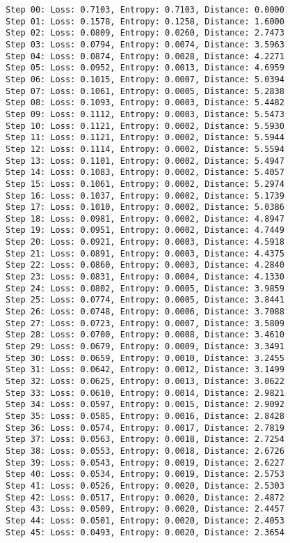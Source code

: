 \documentclass[11pt]{article}
\begin{document}
\begin{Verbatim}[commandchars=\\\{\}]
Step 00: Loss: 0.7103, Entropy: 0.7103, Distance: 0.0000
Step 01: Loss: 0.1578, Entropy: 0.1258, Distance: 1.6000
Step 02: Loss: 0.0809, Entropy: 0.0260, Distance: 2.7473
Step 03: Loss: 0.0794, Entropy: 0.0074, Distance: 3.5963
Step 04: Loss: 0.0874, Entropy: 0.0028, Distance: 4.2271
Step 05: Loss: 0.0952, Entropy: 0.0013, Distance: 4.6959
Step 06: Loss: 0.1015, Entropy: 0.0007, Distance: 5.0394
Step 07: Loss: 0.1061, Entropy: 0.0005, Distance: 5.2838
Step 08: Loss: 0.1093, Entropy: 0.0003, Distance: 5.4482
Step 09: Loss: 0.1112, Entropy: 0.0003, Distance: 5.5473
Step 10: Loss: 0.1121, Entropy: 0.0002, Distance: 5.5930
Step 11: Loss: 0.1121, Entropy: 0.0002, Distance: 5.5944
Step 12: Loss: 0.1114, Entropy: 0.0002, Distance: 5.5594
Step 13: Loss: 0.1101, Entropy: 0.0002, Distance: 5.4947
Step 14: Loss: 0.1083, Entropy: 0.0002, Distance: 5.4057
Step 15: Loss: 0.1061, Entropy: 0.0002, Distance: 5.2974
Step 16: Loss: 0.1037, Entropy: 0.0002, Distance: 5.1739
Step 17: Loss: 0.1010, Entropy: 0.0002, Distance: 5.0386
Step 18: Loss: 0.0981, Entropy: 0.0002, Distance: 4.8947
Step 19: Loss: 0.0951, Entropy: 0.0002, Distance: 4.7449
Step 20: Loss: 0.0921, Entropy: 0.0003, Distance: 4.5918
Step 21: Loss: 0.0891, Entropy: 0.0003, Distance: 4.4375
Step 22: Loss: 0.0860, Entropy: 0.0003, Distance: 4.2840
Step 23: Loss: 0.0831, Entropy: 0.0004, Distance: 4.1330
Step 24: Loss: 0.0802, Entropy: 0.0005, Distance: 3.9859
Step 25: Loss: 0.0774, Entropy: 0.0005, Distance: 3.8441
Step 26: Loss: 0.0748, Entropy: 0.0006, Distance: 3.7088
Step 27: Loss: 0.0723, Entropy: 0.0007, Distance: 3.5809
Step 28: Loss: 0.0700, Entropy: 0.0008, Distance: 3.4610
Step 29: Loss: 0.0679, Entropy: 0.0009, Distance: 3.3491
Step 30: Loss: 0.0659, Entropy: 0.0010, Distance: 3.2455
Step 31: Loss: 0.0642, Entropy: 0.0012, Distance: 3.1499
Step 32: Loss: 0.0625, Entropy: 0.0013, Distance: 3.0622
Step 33: Loss: 0.0610, Entropy: 0.0014, Distance: 2.9821
Step 34: Loss: 0.0597, Entropy: 0.0015, Distance: 2.9092
Step 35: Loss: 0.0585, Entropy: 0.0016, Distance: 2.8428
Step 36: Loss: 0.0574, Entropy: 0.0017, Distance: 2.7819
Step 37: Loss: 0.0563, Entropy: 0.0018, Distance: 2.7254
Step 38: Loss: 0.0553, Entropy: 0.0018, Distance: 2.6726
Step 39: Loss: 0.0543, Entropy: 0.0019, Distance: 2.6227
Step 40: Loss: 0.0534, Entropy: 0.0019, Distance: 2.5753
Step 41: Loss: 0.0526, Entropy: 0.0020, Distance: 2.5303
Step 42: Loss: 0.0517, Entropy: 0.0020, Distance: 2.4872
Step 43: Loss: 0.0509, Entropy: 0.0020, Distance: 2.4457
Step 44: Loss: 0.0501, Entropy: 0.0020, Distance: 2.4053
Step 45: Loss: 0.0493, Entropy: 0.0020, Distance: 2.3654

\end{Verbatim}
\end{document}
